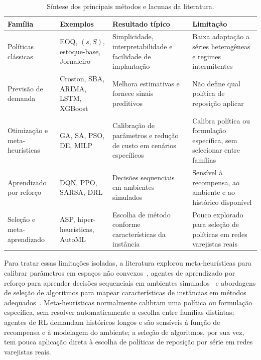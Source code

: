 \begin{table}[htb]
\centering
\small
\setlength{\tabcolsep}{4pt}
\caption{Síntese dos principais métodos e lacunas da literatura.}
\label{tab:sintese_metodos_literatura}
\begin{tabular}{@{}p{2.8cm}p{3.6cm}p{3.4cm}p{3.4cm}@{}}
\toprule
Família & Exemplos & Resultado típico & Limitação \\
\midrule
Políticas clássicas & EOQ, $(s,S)$, estoque-base, Jornaleiro & Simplicidade, interpretabilidade e facilidade de implantação & Baixa adaptação a séries heterogêneas e regimes intermitentes \\
\addlinespace
Previsão de demanda & Croston, SBA, ARIMA, LSTM, XGBoost & Melhora estimativas e fornece sinais preditivos & Não define qual política de reposição aplicar \\
\addlinespace
Otimização e meta-heurísticas & GA, SA, PSO, DE, MILP & Calibração de parâmetros e redução de custo em cenários específicos & Calibra política ou formulação específica, sem selecionar entre famílias \\
\addlinespace
Aprendizado por reforço & DQN, PPO, SARSA, DRL & Decisões sequenciais em ambientes simulados & Sensível à recompensa, ao ambiente e ao histórico disponível \\
\addlinespace
Seleção e meta-aprendizado & ASP, hiper-heurísticas, AutoML & Escolha de método conforme características da instância & Pouco explorado para seleção de políticas em redes varejistas reais \\
\bottomrule
\end{tabular}
\end{table}

Para tratar essas limitações isoladas, a literatura explorou meta-heurísticas para calibrar parâmetros em espaços não convexos~\citep{Talbi2009Metaheuristics,Yuna2023IntermittentMetaheuristics}, agentes de aprendizado por reforço para aprender decisões sequenciais em ambientes simulados~\citep{Oroojlooyjadid2022BeerGameDQN,Gijsbrechts2022DRLInventoryMSOM} e abordagens de seleção de algoritmos para mapear características de instâncias em métodos adequados~\citep{Rice1976AlgorithmSelection,Kerschke2019AutomatedAlgorithmSelection}. Meta-heurísticas normalmente calibram uma política ou formulação específica, sem resolver automaticamente a escolha entre famílias distintas; agentes de RL demandam históricos longos e são sensíveis à função de recompensa e à modelagem do ambiente; a seleção de algoritmos, por sua vez, tem pouca aplicação direta à escolha de políticas de reposição por série em redes varejistas reais.

